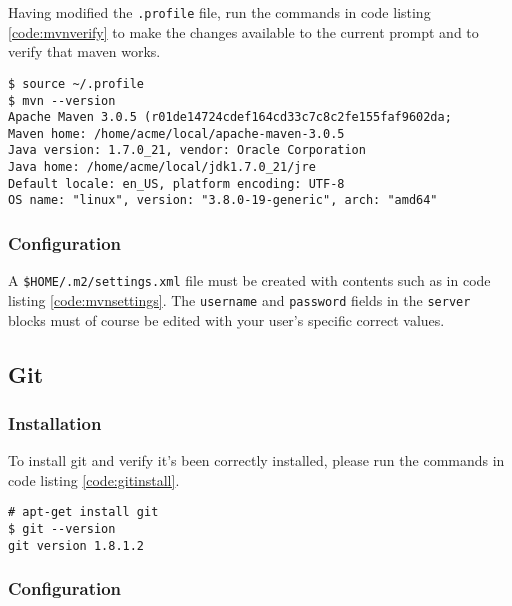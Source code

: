 Having modified the \texttt{.profile} file, run the commands in code
listing \ref{code:mvnverify} to make the changes available to the
current prompt and to verify that maven works.

\begin{lstlisting}[label=code:mvnverify,caption=Sourcing the \texttt{.profile} file and verifying maven works]
$ source ~/.profile
$ mvn --version
Apache Maven 3.0.5 (r01de14724cdef164cd33c7c8c2fe155faf9602da;
Maven home: /home/acme/local/apache-maven-3.0.5
Java version: 1.7.0_21, vendor: Oracle Corporation
Java home: /home/acme/local/jdk1.7.0_21/jre
Default locale: en_US, platform encoding: UTF-8
OS name: "linux", version: "3.8.0-19-generic", arch: "amd64"
\end{lstlisting}

\subsubsection{Configuration}

A \texttt{\$HOME/.m2/settings.xml} file must be created with contents
such as in code listing \ref{code:mvnsettings}. The \texttt{username}
and \texttt{password} fields in the \texttt{server} blocks must of
course be edited with your user's specific correct values.



\subsection{Git}
\subsubsection{Installation}

To install git and verify it's been correctly installed, please run the
commands in code listing \ref{code:gitinstall}.

\begin{lstlisting}[label=code:gitinstall,caption=Installing git and verifying it works]
# apt-get install git
$ git --version
git version 1.8.1.2
\end{lstlisting}

\subsubsection{Configuration}


